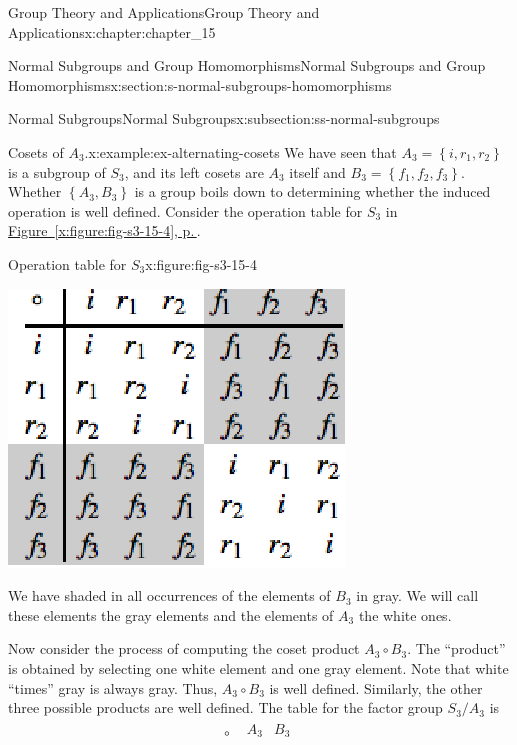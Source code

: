 \documentclass[twoside,10pt,]{book}
\newcommand{\xreffont}{\relax}
\numberwithin{equation}{section}
\begin{document}
\begin{chapterptx}{Group Theory and Applications}{}{Group Theory and Applications}{}{}{x:chapter:chapter_15}
\begin{sectionptx}{Normal Subgroups and Group Homomorphisms}{}{Normal Subgroups and Group Homomorphisms}{}{}{x:section:s-normal-subgroups-homomorphisms}
\begin{subsectionptx}{Normal Subgroups}{}{Normal Subgroups}{}{}{x:subsection:ss-normal-subgroups}
\begin{example}{Cosets of \(A_3\).}{x:example:ex-alternating-cosets}
We have seen that \(A_3= \left\{i,r_1,r_2\right\}\) is a subgroup of \(S_3\), and its left cosets are \(A_3\) itself and \(B_3=\left\{f_1,f_2,f_3\right\}\). Whether \(\left\{A_3 , B_3 \right\}\) is a group boils down to determining whether the induced operation is well defined.   Consider the operation  table for \(S_3\) in \hyperref[x:figure:fig-s3-15-4]{Figure~{\xreffont\ref{x:figure:fig-s3-15-4}}, p.\,\pageref{x:figure:fig-s3-15-4}}.%
\begin{figureptx}{Operation table for \(S_3\)}{x:figure:fig-s3-15-4}{}%
\begin{image}{0.1}{0.8}{0.1}%
\includegraphics[width=\linewidth]{images/fig-s3-15-4.png}
\end{image}%
\tcblower
\end{figureptx}%
We have shaded in all occurrences of the elements of \(B_3\) in gray. We will call these elements the gray elements and the elements of \(A_3\) the white ones.%
\par
Now consider the process of computing the coset product \(A_3\circ B_3\). The  ``product'' is obtained by selecting one white element and one gray element. Note that white ``times'' gray is always gray. Thus, \(A_3\circ B_3\) is well defined. Similarly, the other three possible products are well defined. The table for the factor group \(S_3/A_3\) is%
\begin{equation*}
\begin{array}{c|c}
\circ  & 
\begin{array}{cc}
A_3 & B_3 \\

\end{array}
\end{array}
\end{equation*}
\end{example}
\end{subsectionptx}
\end{sectionptx}
\end{chapterptx}
\end{document}
